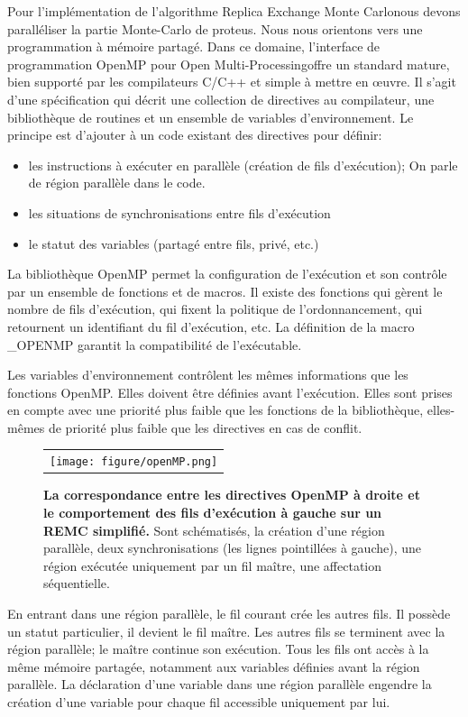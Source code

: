 Pour l'implémentation de l'algorithme \og Replica Exchange Monte Carlo\fg nous devons paralléliser la partie Monte-Carlo de proteus. Nous nous orientons vers une programmation à mémoire partagé. Dans ce domaine, l'interface de programmation OpenMP pour \og Open Multi-Processing\fg  offre un standard mature, bien supporté par les compilateurs C/C++ et simple à mettre en œuvre. Il s'agit d'une spécification qui décrit une collection de directives au compilateur, une bibliothèque de routines et un ensemble de variables d'environnement. Le principe est d'ajouter à un code existant des directives pour définir:
\begin{itemize}
\item les instructions à exécuter en parallèle (création de fils d'exécution); On parle de région parallèle dans le code.
\item les situations de synchronisations entre fils d'exécution
\item le statut des variables (partagé entre fils, privé, etc.) 
\end{itemize} 
La bibliothèque OpenMP permet la configuration de l'exécution et son contrôle par un ensemble de fonctions et de macros. Il existe des fonctions qui gèrent le nombre de fils d'exécution, qui fixent la politique de l'ordonnancement, qui retournent un identifiant du fil d'exécution, etc. La définition de la macro \_OPENMP garantit la compatibilité de l'exécutable.

Les variables d'environnement contrôlent les mêmes informations que les fonctions OpenMP. Elles doivent être définies avant l'exécution. Elles sont prises en compte avec une priorité plus faible que les fonctions de la bibliothèque, elles-mêmes de priorité plus faible que les directives en cas de conflit.

   \begin{figure}[!htbp]
     \centering
     \begin{tabular}{c}
       \texttt{[image: figure/openMP.png]} 
     \end{tabular}     
     \caption{\textbf{La correspondance entre les directives OpenMP à droite et le comportement des fils d'exécution à gauche sur un REMC simplifié.} Sont schématisés, la création d'une région parallèle, deux synchronisations (les lignes pointillées à gauche), une région exécutée uniquement par un fil maître, une affectation séquentielle. }
\label{fig:openMP}
   \end{figure}

En entrant dans une région parallèle, le fil courant crée les autres fils. Il possède un statut particulier, il devient le fil maître. Les autres fils se terminent avec la région parallèle; le maître continue son exécution. Tous les fils ont accès à la même mémoire partagée, notamment aux variables définies avant la région parallèle. La déclaration d'une variable dans une région parallèle engendre la création d'une variable pour chaque fil accessible uniquement par lui. 
   


